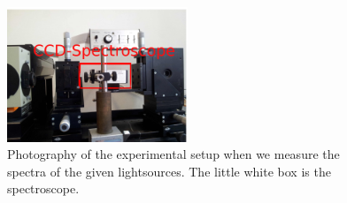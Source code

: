 \begin{figure}
  \begin{center}
    \includegraphics[width=0.48\textwidth]{pics/const1}
  \end{center}
\caption{Photography of the experimental setup when we measure
    the spectra of the given lightsources. The little white box is
    the spectroscope.} 
 \label{fig:const1}

\end{figure}
